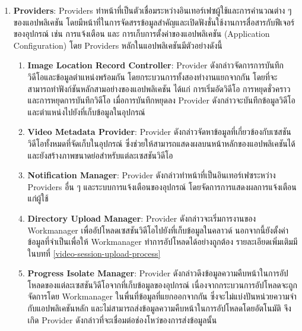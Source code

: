 \begin{enumerate}
    \item \textbf{Providers}: Providers ทำหน้าที่เป็นตัวเชื่อมระหว่างอินเทอร์เฟซผู้ใช้และการคำนวณต่าง ๆ ของแอปพลิเคชัน โดยมีหน้าที่ในการจัดสรรข้อมูลสำคัญและเปิดฟังชั่นใช้งานการสื่อสารกับฟีเจอร์ของอุปกรณ์ เช่น การแจ้งเตือน และ การเก็บการตั้งค่าของแอปพลิเคชัน (Application Configuration) โดย Providers หลักในแอปพลิเคชันมีตัวอย่างดังนี้
    \begin{enumerate}
        \item \textbf{Image Location Record Controller}: Provider ดังกล่าวจัดการการบันทึกวิดีโอและข้อมูลตำแหน่งพร้อมกัน โดยกระบวนการทั้งสองทำงานแยกจากกัน โดยที่จะสามารถทำฟังก์ชันหลักสามอย่างของแอปพลิเคชัน ได้แก่ การเริ่มอัดวิดีโอ การหยุดชั่วคราว และการหยุดการบันทึกวิดีโอ เมื่อการบันทึกหยุดลง Provider ดังกล่าวจะบันทึกข้อมูลวิดีโอและตำแหน่งไปยังที่เก็บข้อมูลในอุปกรณ์
        \item \textbf{Video Metadata Provider}: Provider ดังกล่าวจัดหาข้อมูลที่เกี่ยวข้องกับเซสชันวิดีโอทั้งหมดที่จัดเก็บในอุปกรณ์ ซึ่งช่วยให้สามารถแสดงผลบนหน้าหลักของแอปพลิเคชันได้ และยังสร้างภาพขนาดย่อสำหรับแต่ละเซสชันวิดีโอ  
        \item \textbf{Notification Manager}: Provider ดังกล่าวทำหน้าที่เป็นอินเทอร์เฟซระหว่าง Providers อื่น ๆ และระบบการแจ้งเตือนของอุปกรณ์ โดยจัดการการแสดงผลการแจ้งเตือนแก่ผู้ใช้  
        \item \textbf{Directory Upload Manager}: Provider ดังกล่าวจะเริ่มการงานของ Workmanager เพื่ออัปโหลดเซสชันวิดีโอไปยังที่เก็บข้อมูลในคลาวด์ นอกจากนี้ยังตั้งค่าข้อมูลที่จำเป็นเพื่อให้ Workmanager ทำการอัปโหลดได้อย่างถูกต้อง รายละเอียดเพิ่มเติมมีในบทที่ \ref{video-session-upload-process}
        \item \textbf{Progress Isolate Manager}: Provider ดังกล่าวดึงข้อมูลความคืบหน้าในการอัปโหลดของแต่ละเซสชันวิดีโอจากที่เก็บข้อมูลของอุปกรณ์ เนื่องจากกระบวนการอัปโหลดจะถูกจัดการโดย Workmanager ในพื่นที่ข้อมูลที่แยกออกจากกัน ซึ่งจะไม่แบ่งปันหน่วยความจำกับแอปพลิเคชันหลัก \cite{workmanager-doc} และไม่สามารถส่งข้อมูลความคืบหน้าในการอัปโหลดโดยอัตโนมัติ จึงเกิด Provider ดังกล่าวที่จะเชื่อมต่อช่องโหว่ของการส่งข้อมูลนั้น
    \end{enumerate}
    

\end{enumerate}
